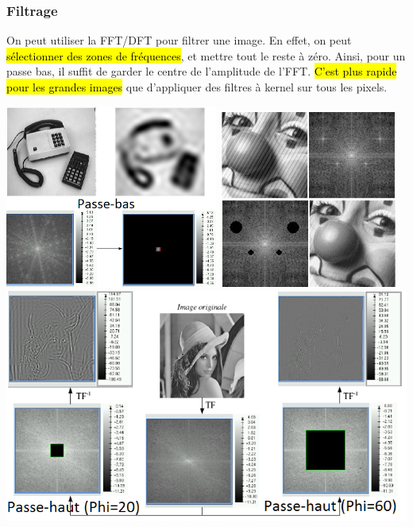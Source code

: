 \documentclass[letterpaper, 12pt]{article}
\newcommand{\alinea}{
\hspace*{0.5cm}}
\begin{document}
		\subsubsection{Filtrage}
			\alinea On peut utiliser la FFT/DFT pour filtrer une image. En effet, on peut \hl{sélectionner des zones de fréquences},
				et mettre tout le reste à zéro. Ainsi, pour un passe bas, il suffit de garder le centre de l'amplitude de l'FFT.
				\hl{C'est plus rapide pour les grandes images} que d'appliquer des filtres à kernel sur tous les pixels.
			\begin{center}
				\includegraphics[width=2.75in]{Images/dft_filter1} \hfill \includegraphics[width=2.33in]{Images/dft_filter3}
				\includegraphics[width=5.25in]{Images/dft_filter2}
			\end{center}
\end{document}
